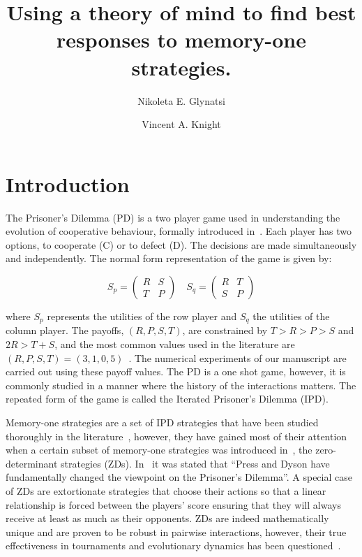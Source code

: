 \documentclass[fleqn,10pt]{wlscirep}
\title{Using a theory of mind to find best responses to memory-one strategies.} %
\author[1,2,*]{Nikoleta E. Glynatsi} %
\author[1]{Vincent A. Knight}
\affil[1]{Cardiff University, School of Mathematics, Cardiff, CF24 4AG, United Kingdom}
\affil[2]{Max Planck Institute for Evolutionary Biology, Pl\"{o}n, 24 306, Germany} %
\affil[*]{glynatsi@evolbio.mpg.de} %
\begin{document}
\flushbottom
\maketitle
%
%
\thispagestyle{empty}

\section*{Introduction}

The Prisoner's Dilemma (PD) is a two player game used in understanding the
evolution of cooperative behaviour, formally introduced in~\cite{Flood1958}.
Each player has two options, to cooperate (C) or to defect (D). The decisions
are made simultaneously and independently. The normal form representation of the
game is given by:

\begin{equation}\label{equ:pd_definition}
    S_p =
    \begin{pmatrix}
        R & S  \\
        T & P
    \end{pmatrix}
    \quad
    S_q =
    \begin{pmatrix}
        R & T  \\
        S & P
    \end{pmatrix}
\end{equation}

where \(S_p\) represents the utilities of the row player and \(S_q\) the
utilities of the column player. The payoffs, \((R, P, S, T)\), are constrained
by \(T > R > P > S\) and \(2R > T + S\), and the most common values used in the
literature are \((R, P, S, T) = (3, 1, 0, 5)\)~\cite{Axelrod1981}.
The numerical experiments of our manuscript are carried out using these
payoff values.
The PD is a one shot game, however, it is commonly studied in a manner where the
history of the interactions matters. The repeated form of the game is called the
Iterated Prisoner's Dilemma (IPD).

Memory-one strategies are a set of IPD strategies that have been
studied thoroughly in the literature~\cite{Nowak1990, Nowak1993}, however, they have gained
most of their attention when a certain subset of memory-one strategies was
introduced in~\cite{Press2012}, the zero-determinant strategies (ZDs). In~\cite{Stewart2012} it
was stated that ``Press and Dyson have fundamentally changed the viewpoint on
the Prisoner's Dilemma''.
A special case of ZDs are extortionate strategies that choose their actions so that a linear relationship is forced
between the players' score ensuring that they will always
receive at least as much as their opponents. ZDs are
indeed mathematically unique and are proven to be robust in pairwise
interactions, however, their true effectiveness in tournaments and
evolutionary dynamics has been questioned~\cite{adami2013, Hilbe2013b,
Hilbe2013, Hilbe2015, Knight2018, Harper2015}.
\end{document}
